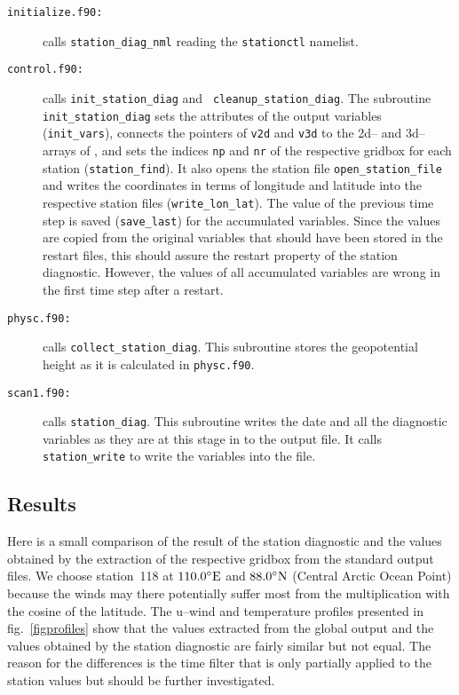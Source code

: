 \begin{appendix}
\begin{description}
\item[{\tt initialize.f90:}] calls {\tt station\_diag\_nml} reading
  the {\tt stationctl} namelist.
\item[{\tt control.f90:}] calls {\tt init\_station\_diag} and {\tt
    cleanup\_station\_diag}. The subroutine {\tt init\_station\_diag}
  sets the attributes of the output variables ({\tt init\_vars}),
  connects the pointers of {\tt v2d} and {\tt v3d} to the 2d-- and
  3d--arrays of \echam, and sets the indices {\tt np} and {\tt nr} of
  the respective gridbox for each station ({\tt station\_find}). It
  also opens the station file {\tt open\_station\_file} and writes the
  coordinates in terms of longitude and latitude into the respective
  station files ({\tt write\_lon\_lat}). The value of the previous
  time step is saved ({\tt save\_last}) for the accumulated
  variables. Since the values are copied from the original \echam{}
  variables that should have been stored in the restart files, this
  should assure the restart property of the station
  diagnostic. However, the values of all accumulated variables are
  wrong in the first time step after a restart. 
\item[{\tt physc.f90:}] calls {\tt collect\_station\_diag}. This
  subroutine stores the geopotential height as it is calculated in
  {\tt physc.f90}. 
\item[{\tt scan1.f90:}] calls {\tt station\_diag}. This subroutine
  writes the date and all the diagnostic variables as they are at this
  stage in \echam{} to the output file. It calls {\tt station\_write}
  to write the variables into the file. 
\end{description}

\subsection{Results}

Here is a small comparison of the result of the station diagnostic and
the values obtained by the extraction of the respective gridbox from
the standard \echam{} output files. We choose station~118 at
$110.0^\circ{\rm E}$ and $88.0^\circ{\rm N}$ (Central Arctic Ocean
Point) because the winds may there potentially suffer most from the
multiplication with the cosine of the latitude.
The u--wind and temperature profiles presented in
fig.~\ref{figprofiles} show that the values extracted from the global
output and the values obtained by the station diagnostic are fairly
similar but not equal. The reason for the differences is the time
filter that is only partially applied to the station values but should
be further investigated.


\end{appendix}

